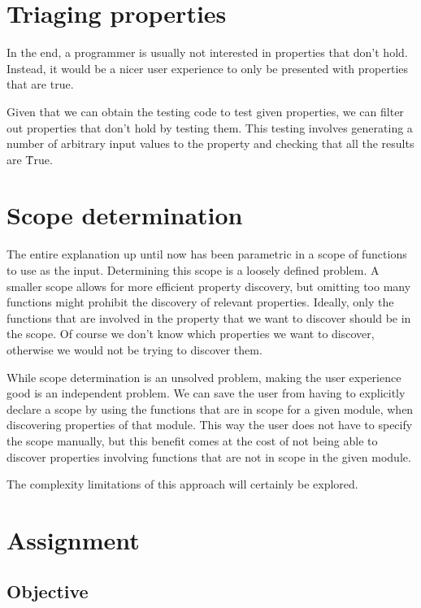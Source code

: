 \documentclass[a4paper, 11pt, onepage]{article}
\begin{document}


\section{Triaging properties}

In the end, a programmer is usually not interested in properties that don't hold.
Instead, it would be a nicer user experience to only be presented with properties that are true.

Given that we can obtain the testing code to test given properties, we can filter out properties that don't hold by testing them.
This testing involves generating a number of arbitrary input values to the property and checking that all the results are \h{True}.


\section{Scope determination}

The entire explanation up until now has been parametric in a scope of functions to use as the input.
Determining this scope is a loosely defined problem.
A smaller scope allows for more efficient property discovery, but omitting too many functions might prohibit the discovery of relevant properties.
Ideally, only the functions that are involved in the property that we want to discover should be in the scope.
Of course we don't know which properties we want to discover, otherwise we would not be trying to discover them.

While scope determination is an unsolved problem, making the user experience good is an independent problem.
We can save the user from having to explicitly declare a scope by using the functions that are in scope for a given module, when discovering properties of that module.
This way the user does not have to specify the scope manually, but this benefit comes at the cost of not being able to discover properties involving functions that are not in scope in the given module.

The complexity limitations of this approach will certainly be explored. 


\section{Assignment}

\subsection{Objective}
\end{document}

